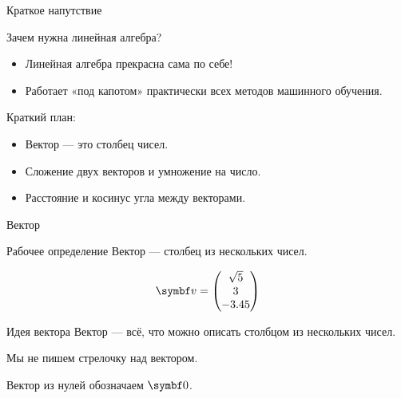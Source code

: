 
\begin{frame} %


\end{frame}




\begin{frame}{Краткое напутствие}

    Зачем нужна \alert{линейная алгебра}?

\begin{itemize}[<+->]
  \item Линейная алгебра прекрасна сама по себе!
  \item Работает «под капотом» практически всех методов машинного обучения.
\end{itemize}

\end{frame}



\begin{frame}{Краткий план:}
  \begin{itemize}[<+->]
    \item Вектор — это столбец чисел.
    \item Сложение двух векторов и умножение на число.
    \item Расстояние и косинус угла между векторами.
  \end{itemize}

\end{frame}


\begin{frame}{Вектор}


\begin{block}{Рабочее определение}
\alert{Вектор} — столбец из нескольких чисел.   

\[
\bv = \begin{pmatrix}
  \sqrt{5} \\
  3 \\
  -3.45
\end{pmatrix}
\]
\end{block}

\pause

\begin{block}{Идея вектора}
Вектор — всё, что можно описать столбцом из нескольких чисел. 
\end{block}

\pause
Мы не пишем стрелочку над вектором.

\pause
Вектор из нулей обозначаем $\bzero$.


\end{frame}



